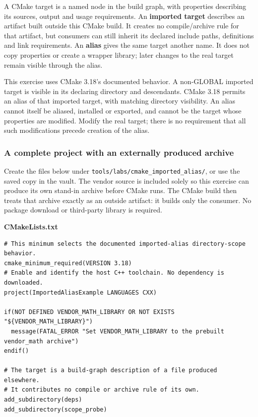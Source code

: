 A CMake target is a named node in the build graph, with properties describing its sources, output and usage requirements. An \textbf{imported target} describes an artifact built outside this CMake build. It creates no compile/archive rule for that artifact, but consumers can still inherit its declared include paths, definitions and link requirements. An \textbf{alias} gives the same target another name. It does not copy properties or create a wrapper library; later changes to the real target remain visible through the alias.

This exercise uses CMake 3.18's documented behavior. A non-GLOBAL imported target is visible in its declaring directory and descendants. CMake 3.18 permits an alias of that imported target, with matching directory visibility. An alias cannot itself be aliased, installed or exported, and cannot be the target whose properties are modified. Modify the real target; there is no requirement that all such modifications precede creation of the alias.

\subsubsection{A complete project with an externally produced archive}\label{05-engine-i-ch012-a-complete-project-with-an-externally-produced-archive}

Create the files below under \texttt{tools/labs/cmake\_imported\_alias/}, or use the saved copy in the vault. The vendor source is included solely so this exercise can produce its own stand-in archive before CMake runs. The CMake build then treats that archive exactly as an outside artifact: it builds only the consumer. No package download or third-party library is required.

\textbf{CMakeLists.txt}

\begin{verbatim}
# This minimum selects the documented imported-alias directory-scope behavior.
cmake_minimum_required(VERSION 3.18)
# Enable and identify the host C++ toolchain. No dependency is downloaded.
project(ImportedAliasExample LANGUAGES CXX)

if(NOT DEFINED VENDOR_MATH_LIBRARY OR NOT EXISTS "${VENDOR_MATH_LIBRARY}")
  message(FATAL_ERROR "Set VENDOR_MATH_LIBRARY to the prebuilt vendor_math archive")
endif()

# The target is a build-graph description of a file produced elsewhere.
# It contributes no compile or archive rule of its own.
add_subdirectory(deps)
add_subdirectory(scope_probe)
\end{verbatim}


